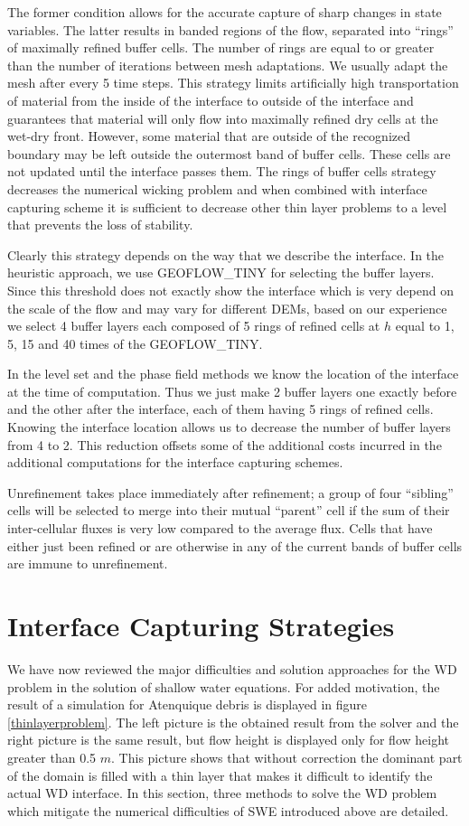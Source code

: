 \documentclass[review]{elsarticle}
\begin{document}
The former condition allows for the accurate capture of sharp changes in state variables. The latter results in banded regions of the flow, separated into ``rings'' of maximally refined buffer cells. The number of rings are equal to or greater than the number of iterations between mesh adaptations. We usually adapt the mesh after every 5 time steps. This strategy limits artificially high transportation of material from the inside of the interface to outside of the interface and guarantees that material will only flow into maximally refined dry 
cells at the wet-dry front.
However, some material that are outside of the recognized boundary may be left outside the outermost band of buffer cells. These cells are not updated until the interface passes them.
The rings of buffer cells strategy decreases the numerical wicking problem and when combined with interface capturing scheme it is sufficient to decrease other thin layer problems to a level that 
prevents the loss of stability.

Clearly this strategy depends on the way that we describe the interface. In the heuristic approach, we use GEOFLOW\_TINY for selecting the buffer layers. Since this threshold does not exactly show the interface which is very depend on the scale of the flow and may vary for different DEMs, based on our experience we select 4 buffer layers each composed of 5 rings of refined cells at $h$ equal to 1, 5, 15 and 40 times of the GEOFLOW\_TINY.

In the level set and the phase field methods  we know the location of the interface at the time of computation. Thus we just make 2 buffer layers one exactly before and the other after the interface, each of them having 5 rings of refined cells. Knowing the interface location allows us to decrease the number of buffer layers from 4 to 2. This reduction
offsets some of the additional costs incurred in the additional computations for the interface capturing schemes.
  

Unrefinement takes place immediately after refinement; a group of four ``sibling'' cells will be selected to merge into their mutual ``parent'' cell if the sum of their inter-cellular fluxes is very 
low compared to the average flux.  Cells that have either just been refined or are otherwise in any of the current bands of buffer cells are immune 
to unrefinement.  
    
\section{Interface Capturing Strategies}\label{solution}
We have now reviewed the major difficulties and solution approaches for the WD problem in the solution of shallow water
equations.
For added motivation, the result of a simulation for Atenquique debris is displayed in figure \ref{thinlayerproblem}. 
The left picture is the obtained result from the solver and the right picture is the same result, but flow height is displayed 
only for flow height greater than 0.5 $m$. This picture shows that without correction the dominant part of the 
domain is filled with a thin layer  that  makes it difficult to identify the actual WD interface.
In this section, three methods to solve the WD problem which mitigate the numerical difficulties of SWE introduced above are detailed. 
\end{document}
